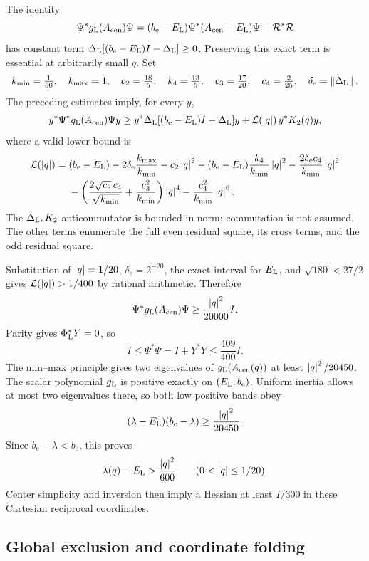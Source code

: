 The identity
\[
 \Psi^*g_{\rm L}(A_{\rm cen})\Psi
 =(b_{\mathrm e}-E_{\rm L})\Psi^*(A_{\rm cen}-E_{\rm L})\Psi-\mathcal R^*\mathcal R
\]
has constant term
\(\Delta_{\rm L}[(b_{\mathrm e}-E_{\rm L})I-\Delta_{\rm L}]\ge0\).
Preserving this exact term is essential at arbitrarily small \(q\).
Set
\[
 k_{\min}=\tfrac1{50},\quad k_{\max}=1,\quad
 c_2=\tfrac{18}{5},\quad k_4=\tfrac{13}{5},\quad
 c_3=\tfrac{17}{20},\quad c_4=\tfrac2{25},\quad
 \delta_{\mathrm e}=\left\lVert \Delta_{\rm L}\right\rVert.
\]
The preceding estimates imply, for every \(y\),
\[
 y^*\Psi^*g_{\rm L}(A_{\rm cen})\Psi y
 \ge y^*\Delta_{\rm L}[(b_{\mathrm e}-E_{\rm L})I-\Delta_{\rm L}]y
       +\mathcal L(\left\lvert q\right\rvert)\,y^*K_2(q)y,
\]
where a valid lower bound is
\begin{align}
 \mathcal L(\left\lvert q\right\rvert)={}&(b_{\mathrm e}-E_{\rm L})
 -2\delta_{\mathrm e}\frac{k_{\max}}{k_{\min}}
 -c_2\left\lvert q\right\rvert^2-(b_{\mathrm e}-E_{\rm L})\frac{k_4}{k_{\min}}\left\lvert q\right\rvert^2
 -\frac{2\delta_{\mathrm e}c_4}{k_{\min}}\left\lvert q\right\rvert^2 \nonumber\\
 &-\left(
 \frac{2\sqrt{c_2}\,c_4}{\sqrt{k_{\min}}}
 +\frac{c_3^2}{k_{\min}}\right)\left\lvert q\right\rvert^4
 -\frac{c_4^2}{k_{\min}}\left\lvert q\right\rvert^6.
 \label{d:eq:appendix-polynomial-margin}
\end{align}
The \(\Delta_{\rm L},K_2\) anticommutator is bounded in norm; commutation is
not assumed. The other terms enumerate the full even residual square,
its cross terms, and the odd residual square.

Substitution of \(\left\lvert q\right\rvert=1/20\), \(\delta_{\mathrm e}=2^{-20}\), the exact
interval for \(E_{\rm L}\), and \(\sqrt{180}<27/2\) gives
\(\mathcal L(\left\lvert q\right\rvert)>1/400\) by rational arithmetic. Therefore
\[
 \Psi^*g_{\rm L}(A_{\rm cen})\Psi\ge\frac{\left\lvert q\right\rvert^2}{20000}I.
\]
Parity gives \(\Phi_{\rm L}^*Y=0\), so
\[
 I\le\Psi^*\Psi=I+Y^*Y\le\frac{409}{400}I.
\]
The min--max principle gives two eigenvalues of
\(g_{\rm L}(A_{\rm cen}(q))\) at least \(\left\lvert q\right\rvert^2/20450\).
The scalar polynomial \(g_{\rm L}\) is positive exactly on
\((E_{\rm L},b_{\mathrm e})\). Uniform inertia allows at most two eigenvalues
there, so both low positive bands obey
\[
 (\lambda-E_{\rm L})(b_{\mathrm e}-\lambda)\ge\frac{\left\lvert q\right\rvert^2}{20450}.
\]
Since \(b_{\mathrm e}-\lambda<b_{\mathrm e}\), this proves
\[
 \lambda(q)-E_{\rm L}>\frac{\left\lvert q\right\rvert^2}{600}
 \qquad(0<\left\lvert q\right\rvert\le1/20).
\]
Center simplicity and inversion then imply a Hessian at least
\(I/300\) in these Cartesian reciprocal coordinates.

\subsection{Global exclusion and coordinate folding}

